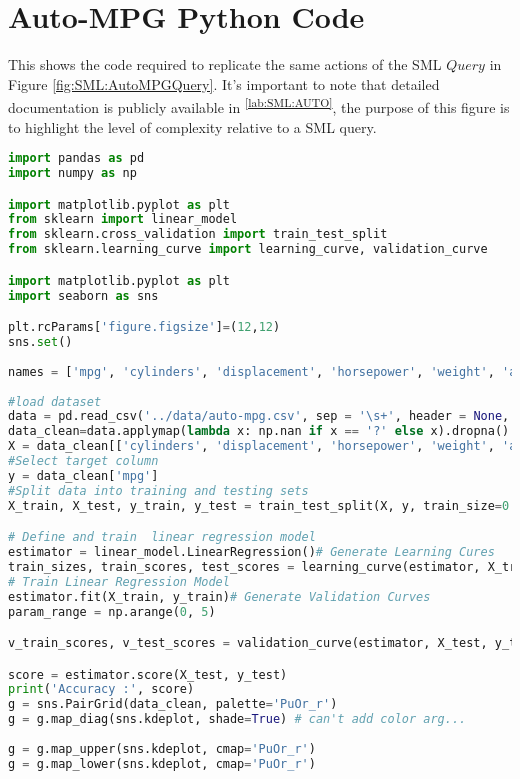 \section{Auto-MPG Python Code}
This shows the code required to replicate the same actions of the SML \(Query\) in Figure \ref{fig:SML:AutoMPGQuery}. It's important to note that detailed documentation is publicly available in \textsuperscript{\ref{lab:SML:AUTO}}, the purpose of this figure is to highlight the level of complexity relative to a SML query.
\begin{lstlisting}[language=python]
import pandas as pd
import numpy as np

import matplotlib.pyplot as plt
from sklearn import linear_model
from sklearn.cross_validation import train_test_split
from sklearn.learning_curve import learning_curve, validation_curve

import matplotlib.pyplot as plt
import seaborn as sns

plt.rcParams['figure.figsize']=(12,12)
sns.set()
 
names = ['mpg', 'cylinders', 'displacement', 'horsepower', 'weight', 'acceleration', 'model_year', 'origin', 'car_name']
 
#load dataset
data = pd.read_csv('../data/auto-mpg.csv', sep = '\s+', header = None, names = names)
data_clean=data.applymap(lambda x: np.nan if x == '?' else x).dropna()
X = data_clean[['cylinders', 'displacement', 'horsepower', 'weight', 'acceleration', 'model_year', "origin"]]
#Select target column
y = data_clean['mpg']
#Split data into training and testing sets
X_train, X_test, y_train, y_test = train_test_split(X, y, train_size=0.8, test_size=0.2)

# Define and train  linear regression model
estimator = linear_model.LinearRegression()# Generate Learning Cures
train_sizes, train_scores, test_scores = learning_curve(estimator, X_train, y_train) 
# Train Linear Regression Model
estimator.fit(X_train, y_train)# Generate Validation Curves
param_range = np.arange(0, 5)

v_train_scores, v_test_scores = validation_curve(estimator, X_test, y_test, param_name='normalize', param_range=param_range)

score = estimator.score(X_test, y_test)
print('Accuracy :', score)
g = sns.PairGrid(data_clean, palette='PuOr_r')
g = g.map_diag(sns.kdeplot, shade=True) # can't add color arg...
 
g = g.map_upper(sns.kdeplot, cmap='PuOr_r')
g = g.map_lower(sns.kdeplot, cmap='PuOr_r')
 

\end{lstlisting}
